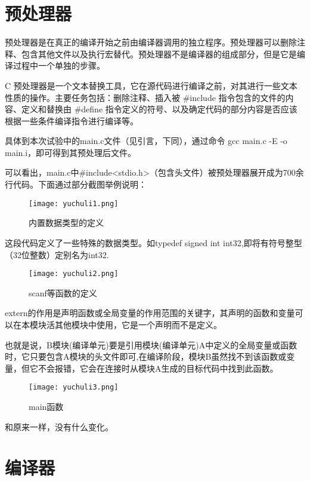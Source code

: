 \documentclass[lang=cn,11pt,a4paper,cite=authoryear]{elegantpaper}
\begin{document}
\section{预处理器}
预处理器是在真正的编译开始之前由编译器调用的独立程序。预处理器可以删除注释、包含其他文件以及执行宏替代。预处理器不是编译器的组成部分，但是它是编译过程中一个单独的步骤。

C 预处理器是一个文本替换工具，它在源代码进行编译之前，对其进行一些文本性质的操作。主要任务包括：删除注释、插入被 #include 指令包含的文件的内容、定义和替换由 #define 指令定义的符号、以及确定代码的部分内容是否应该根据一些条件编译指令进行编译等。

具体到本次试验中的main.c文件（见引言，下同），通过命令 gcc main.c -E -o main.i，即可得到其预处理后文件。 

可以看出，main.c中#include<stdio.h>（包含头文件）被预处理器展开成为700余行代码。下面通过部分截图举例说明：

\begin{figure}[htbp]
  \centering
  \texttt{[image: yuchuli1.png]}
  \caption{内置数据类型的定义}
\end{figure}

这段代码定义了一些特殊的数据类型。如typedef signed int int32,即将有符号整型
（32位整数）定别名为int32.

\clearpage

\begin{figure}[htbp]
  \centering
  \texttt{[image: yuchuli2.png]}
  \caption{scanf等函数的定义}
\end{figure}

extern的作用是声明函数或全局变量的作用范围的关键字，其声明的函数和变量可以在本模块活其他模块中使用，它是一个声明而不是定义。

也就是说，B模块(编译单元)要是引用模块(编译单元)A中定义的全局变量或函数时，它只要包含A模块的头文件即可,在编译阶段，模块B虽然找不到该函数或变量，但它不会报错，它会在连接时从模块A生成的目标代码中找到此函数。

\begin{figure}[htbp]
  \centering
  \texttt{[image: yuchuli3.png]}
  \caption{main函数}
\end{figure}

和原来一样，没有什么变化。

\clearpage

\section{编译器}
\end{document}
